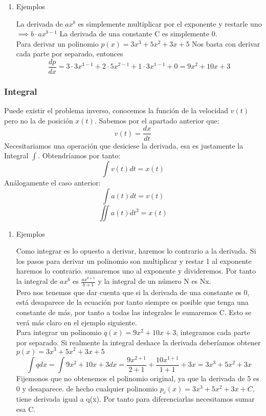 \documentclass[11pt]{article}
\begin{document}
\begin{enumerate}
\item Ejemplos
\label{sec:org0dfbc07}

   La derivada de \(ax^{b}\) es simplemente multiplicar por el exponente y restarle uno \(\implies b \cdot ax^{b-1}\)
   La derivada de una constante C es simplemente 0. \\
   Para derivar un polinomio \(p(x) = 3x^{3} + 5x^{2} + 3x + 5\) Nos basta con derivar cada parte por separado, entonces 
   \[ 
   \frac{dp}{dx} = 3 \cdot3x^{3-1} + 2 \cdot 5x^{2-1} + 1 \cdot 3x^{1-1} + 0 = 9x^{2} + 10x + 3 
   \]
\end{enumerate}
\subsubsection{Integral}
\label{sec:orgc200a45}
Puede existir el problema inverso, conocemos la función de la velocidad \(v(t)\)pero no la de posición \(x(t)\). Sabemos por el apartado anterior que:
\[
v(t) =  \frac{dx}{dt}
\]
Necesitariamos una operación que desiciese la derivada, esa es justamente la Integral \(\int\). Obtendríamos por tanto:
\[
\int v(t) dt = x(t)
\]
Análogamente el caso anterior: 
\[
\int a(t) dt = v(t)
\]
\[
\iint a(t) dt^{2} = x(t)
\]

\begin{enumerate}
\item Ejemplos
\label{sec:orgcf6f794}

Como integrar es lo opuesto a derivar, haremos lo contrario a la derivada.
Si los pasos para derivar un polinomio son multiplicar y restar 1 al exponente haremos lo contrario. sumaremos uno al exponente y divideremos.
Por tanto la integral de \(ax^b\) es \(\frac{ax^{b+1}}{b+1}\) y la integral de un número N es Nx.\\
Pero nos tenemos que dar cuenta que si la derivada de una constante es 0, está desaparece de la ecuación por tanto siempre es posible que tenga una constante de más, por tanto a todas las integrales le sumaremos C. Esto se verá más claro en el ejemplo siguiente. \\
Para integrar un polinomio \(q(x) = 9x^{2} + 10x + 3\), integramos cada parte por separado. Si realmente la integral deshace la derivada deberíamos obtener  \(p(x) = 3x^{3} + 5x^{2} + 3x + 5\)
   \[ 
   \int q dx  =  \int 9x^{2} + 10x + 3 dx = \frac{9x^{2+1}}{2+1} + \frac{10x^{1+1}}{1+1} + 3x = 3x^{3} + 5x^{2} + 3x
   \]
Fijemonos que no obtenemos el polinomio original, ya que la derivada de 5 es 0 y desaparece. de hecho cualquier polinomio \(p_{c}(x) = 3x^{3} + 5x^{2} + 3x + C\), tiene derivada igual a q(x). Por tanto para diferenciarlas necesitamos sumar esa C.
\end{enumerate}
\end{document}
